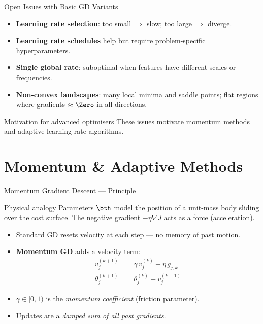 \begin{frame}{Open Issues with Basic GD Variants}
  \begin{itemize}
    \item \textbf{Learning rate selection}: too small $\Rightarrow$ slow; too large $\Rightarrow$ diverge.
    \item \textbf{Learning rate schedules} help but require problem-specific hyperparameters.
    \item \textbf{Single global rate}: suboptimal when features have different scales or frequencies.
    \item \textbf{Non-convex landscapes}: many local minima and saddle points;
          flat regions where gradients $\approx\Zero$ in all directions.
  \end{itemize}
  \begin{alertblock}{Motivation for advanced optimisers}
    These issues motivate momentum methods and adaptive learning-rate algorithms.
  \end{alertblock}
\end{frame}

\section{Momentum \& Adaptive Methods}

\begin{frame}{Momentum Gradient Descent — Principle}
  \begin{block}{Physical analogy}
    Parameters $\bth$ model the position of a unit-mass body sliding over the cost surface.
    The negative gradient $-\eta\nabla J$ acts as a force (acceleration).
  \end{block}
  \vspace{6pt}
  \begin{itemize}
    \item Standard GD resets velocity at each step — no memory of past motion.
    \item \textbf{Momentum GD} adds a velocity term:
      \begin{align*}
        v_j^{(k+1)} &= \gamma\, v_j^{(k)} - \eta\, g_{j,k}\\
        \theta_j^{(k+1)} &= \theta_j^{(k)} + v_j^{(k+1)}
      \end{align*}
    \item $\gamma\in[0,1)$ is the \emph{momentum coefficient} (friction parameter).
    \item Updates are a \emph{damped sum of all past gradients}.
  \end{itemize}
\end{frame}


